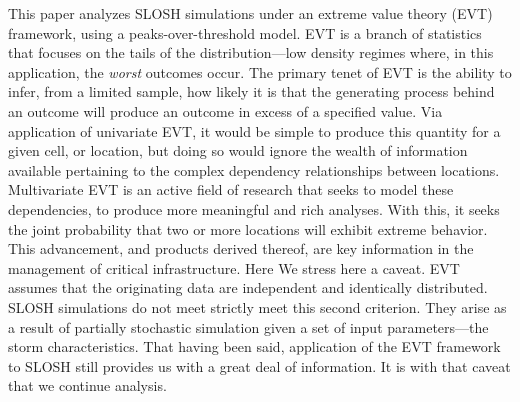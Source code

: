 This paper analyzes SLOSH simulations under an extreme value theory (EVT) framework,
    using a peaks-over-threshold model.  EVT is a branch of statistics that focuses
    on the tails of the distribution---low density regimes where, in this application,
    the \emph{worst} outcomes occur.  The primary tenet of EVT is the ability to infer,
    from a limited sample, how likely it is that the generating process behind an outcome
    will produce an outcome in excess of a specified value. Via application of univariate 
    EVT, it would be simple to produce this quantity for a given cell, or location, but 
    doing so would ignore the wealth of information available pertaining to the complex 
    dependency relationships between locations.  Multivariate EVT is an active 
    field of research that seeks to model these dependencies, to produce more meaningful
    and rich analyses.  With this, it seeks the joint probability that two or more locations
    will exhibit extreme behavior.  This advancement, and products derived thereof,
    are key information in the management of critical infrastructure.
    Here We stress here a caveat. EVT assumes that the originating data are independent
    and identically distributed.  SLOSH simulations do not meet strictly meet this 
    second criterion.  They arise as a result of partially stochastic simulation 
    given a set of input parameters---the storm characteristics. That
    having been said, application of the EVT framework to SLOSH still provides us
    with a great deal of information.  It is with that caveat that we continue analysis.


